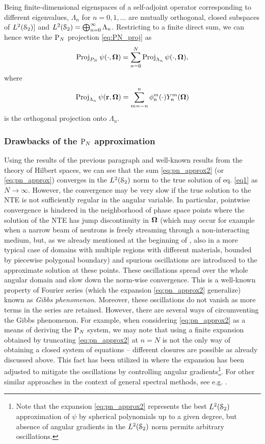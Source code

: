 Being finite-dimensional eigenspaces of a self-adjoint operator
corresponding to different eigenvalues, $\Lambda_n$ for $n=0,1,\ldots$ are mutually orthogonal, closed subspaces of
$\Lp[2](\Sphere)]$ and $\Lp[2](\Sphere) = \bigoplus_{n=0}^{\infty}\Lambda_n$.
Restricting to a finite direct sum, we can hence write the $\PN$ projection \eqref{eq:PN_proj} as
\begin{equation}\label{eq:pn_approx2}
	\Projop\psi(\cdot,\bomega) = \suma[n]{0}{N}\Projop[\Lambda_n]\psi(\cdot,\bomega),
\end{equation}
where 
$$
	\Projop[\Lambda_n]\psi(\br,\bomega) = \suma[m]{-n}{n}\angmom{n}{m}(\cdot)\Y{n}{m}(\bomega)
$$
is the orthogonal projection onto $\Lambda_n$.  



\subsubsection{Drawbacks of the $\PN$ approximation}
Using the results of the previous paragraph and well-known results from the theory of Hilbert spaces, we can see that
the sum \eqref{eq:pn_approx2} (or \eqref{eq:pn_approx}) converges in the $\Lp[2](\Sphere)$ norm to the true solution of
eq. \eqref{eq1} as $N\to\infty$. However, the convergence may be very slow if the true solution to the NTE is not
sufficiently regular in the angular variable. In particular, pointwise convergence is hindered in the neighborhood of
phase space points where the solution of the NTE has jump discontinuity in $\bomega$ (which may occur for example when a
narrow beam of neutrons is freely streaming through a non-interacting medium, but, as we already mentioned at the
beginning of , also in a more typical case of domains with multiple regions with different materials,
bounded by piecewise polygonal boundary) and spurious oscillations are introduced to the approximate solution at these points.
These oscillations spread over the whole angular domain and slow down the norm-wise convergence. This is a well-known
property of Fourier series (which the expansion \eqref{eq:pn_approx2} generalize) known as \textit{Gibbs phenomenon}.
Moreover, these oscillations do not vanish as more terms in the series are retained. However, there are several ways of
circumventing the Gibbs phenomenon. For example, when considering \eqref{eq:pn_approx2} as a means of deriving the $\PN$
system, we may note that using a finite expansion obtained by truncating \eqref{eq:pn_approx2} at $n=N$ is not the only
way of obtaining a closed system of equations -- different closures are possible as already discussed above. This fact
has been utilized in \cite{McClarren3} where the expansion has been adjusted to mitigate the oscillations by controlling
angular gradients\footnote{Note that the expansion \eqref{eq:pn_approx2} represents the best $\Lp[2](\Sphere)$
approximation of $\psi$ by spherical polynomials up to a given degree, but absence of angular gradients in the
$\Lp[2](\Sphere)$ norm permits arbitrary oscillations.}. For other similar approaches in the context of general spectral
methods, see e.g. \cite{Tanner}.


